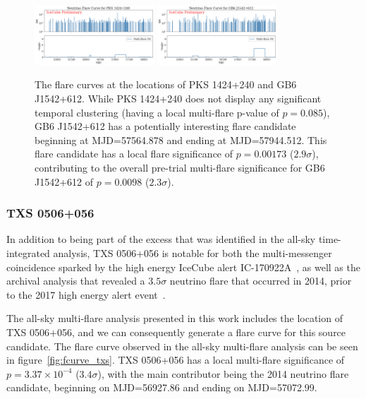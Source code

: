 \begin{figure}[h]
\centering
\includegraphics[width=0.4\textwidth]{figs/fcurve_PKS1424+240.png}
\includegraphics[width=0.4\textwidth]{figs/fcurve_GB6.png}
\caption{The flare curves at the locations of PKS 1424+240 and GB6 J1542+612. While PKS 1424+240 does not display any significant temporal clustering (having a local multi-flare p-value of $p=0.085$), GB6 J1542+612 has a potentially interesting flare candidate beginning at MJD=57564.878 and ending at MJD=57944.512. This flare candidate has a local flare significance of $p=0.00173$ ($2.9 \sigma$), contributing to the overall pre-trial multi-flare significance for GB6 J1542+612 of $p=0.0098$ ($2.3 \sigma$). }
\label{fig:othertints}
\end{figure}

\subsubsection{TXS 0506+056}
In addition to being part of the excess that was identified in the all-sky time-integrated analysis, TXS 0506+056 is notable for both the multi-messenger coincidence sparked by the high energy IceCube alert IC-170922A~\cite{TXS_Multimessenger}, as well as the archival analysis that revealed a $3.5 \sigma$ neutrino flare that occurred in 2014, prior to the 2017 high energy alert event~\cite{TXS_Archival}.

The all-sky multi-flare analysis presented in this work includes the location of TXS 0506+056, and we can consequently generate a flare curve for this source candidate. The flare curve observed in the all-sky multi-flare analysis can be seen in figure~\ref{fig:fcurve_txs}. TXS 0506+056 has a local multi-flare significance of $p=3.37 \times 10^{-4}$ ($3.4 \sigma$), with the main contributor being the 2014 neutrino flare candidate, beginning on MJD=56927.86 and ending on MJD=57072.99.


